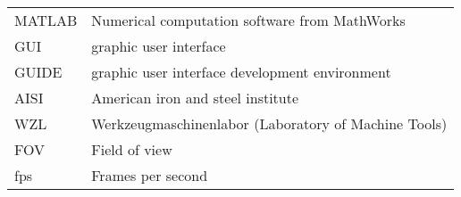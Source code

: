 \begin{longtable}{ll}
MATLAB & Numerical computation software from MathWorks\\
GUI & graphic user interface \\
GUIDE & graphic user interface development environment\\
AISI & American iron and steel institute\\
WZL & Werkzeugmaschinenlabor (Laboratory of Machine Tools)\\
FOV & Field of view\\
fps & Frames per second\\
\end{longtable}

